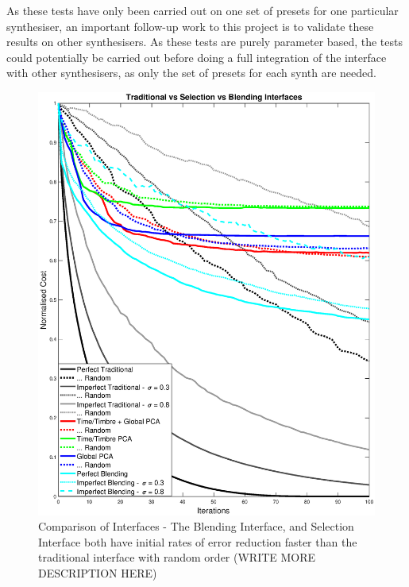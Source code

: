 \documentclass[11pt, oneside]{report}   	%
\begin{document}
As these tests have only been carried out on one set of presets for one particular synthesiser, an important follow-up work to this project is to validate these results on other synthesisers. As these tests are purely parameter based, the tests could potentially be carried out before doing a full integration of the interface with other synthesisers, as only the set of presets for each synth are needed.

\begin{figure}
	\hspace{-50pt}
	\includegraphics[trim = {0, 2cm, 0, 0}, clip, width = 7.6in]{comparisonOfAllInterfaceGraph3.eps}
	\caption{Comparison of Interfaces - The Blending Interface, and Selection Interface both have initial rates of error reduction faster than the traditional interface with random order (WRITE MORE DESCRIPTION HERE)}
	\label{fig:CombinedTest1}
\end{figure}
\end{document}
